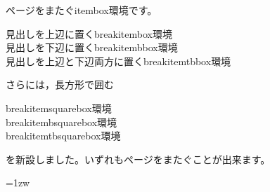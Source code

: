 \documentclass{jarticle}
\begin{document}
ページをまたぐ\textsf{itembox}環境です。

\begin{jquote}
見出しを上辺に置く\textsf{breakitembox}環境\\
見出しを下辺に置く\textsf{breakitembbox}環境\\
見出しを上辺と下辺両方に置く\textsf{breakitemtbbox}環境\\
\end{jquote}
さらには，長方形で囲む
\begin{jquote}
\textsf{breakitemsquarebox}環境\\
\textsf{breakitembsquarebox}環境\\
\textsf{breakitemtbsquarebox}環境
\end{jquote}
を新設しました。いずれもページをまたぐことが出来ます。

\fboxsep=1zw\relax
\def\breakboxparindent{1zw}%
\end{document}
